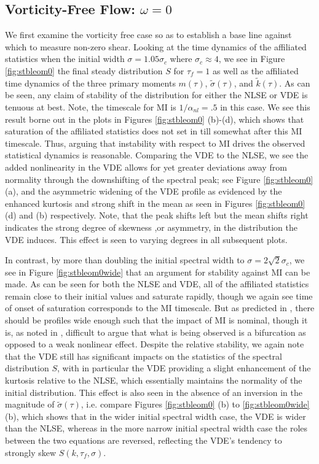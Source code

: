\documentclass[a4paper,11pt]{article}
\begin{document}
\subsection*{Vorticity-Free Flow: $\omega = 0$}

We first examine the vorticity free case so as to establish a base line against which to measure non-zero shear.  Looking at the time dynamics of the affiliated statistics when the initial width $\sigma=1.05\sigma_{c}$ where $\sigma_{c}\approx 4$, we see in Figure \ref{fig:stbleom0} the final steady distribution $S$ for $\tau_{f}=1$ as well as the affiliated time dynamics of the three primary moments $m(\tau)$, $\tilde{\sigma}(\tau)$, and $\tilde{k}(\tau)$.  As can be seen, any claim of stability of the distribution for either the NLSE or VDE is tenuous at best.  Note, the timescale for MI is $1/\alpha_{nl} = .5$ in this case.  We see this result borne out in the plots in Figures \ref{fig:stbleom0} (b)-(d), which shows that saturation of the affiliated statistics does not set in till somewhat after this MI timescale.  Thus, arguing that instability with respect to MI drives the observed statistical dynamics is reasonable.  Comparing the VDE to the NLSE, we see the added nonlinearity in the VDE allows for yet greater deviations away from normality through the downshifting of the spectral peak; see Figure \ref{fig:stbleom0} (a), and the asymmetric widening of the VDE profile as evidenced by the enhanced kurtosis and strong shift in the mean as seen in Figures \ref{fig:stbleom0} (d) and (b) respectively.  Note, that the peak shifts left but the mean shifts right indicates the strong degree of skewness ,or asymmetry, in the distribution the VDE induces.  This effect is seen to varying degrees in all subsequent plots.     

In contrast, by more than doubling the initial spectral width to $\sigma = 2\sqrt{2}\sigma_{c}$, we see in Figure \ref{fig:stbleom0wide} that an argument for stability against MI can be made.  As can be seen for both the NLSE and VDE, all of the affiliated statistics remain close to their initial values and saturate rapidly, though we again see time of onset of saturation corresponds to the MI timescale.  But as predicted in \cite{alber}, there should be profiles wide enough such that the impact of MI is nominal, though it is, as noted in \cite{janssen}, difficult to argue that what is being observed is a bifurcation as opposed to a weak nonlinear effect.   Despite the relative stability, we again note that the VDE still has significant impacts on the statistics of the spectral distribution $S$, with in particular the VDE providing a slight enhancement of the kurtosis relative to the NLSE, which essentially maintains the normality of the initial distribution.  This effect is also seen in the absence of an inversion in the magnitude of $\tilde{\sigma}(\tau)$, i.e. compare Figures \ref{fig:stbleom0} (b) to \ref{fig:stbleom0wide} (b), which shows that in the wider initial spectral width case, the VDE is wider than the NLSE, whereas in the more narrow initial spectral width case the roles between the two equations are reversed, reflecting the VDE's tendency to strongly skew $S(k,\tau_{f},\sigma)$.
\end{document}
